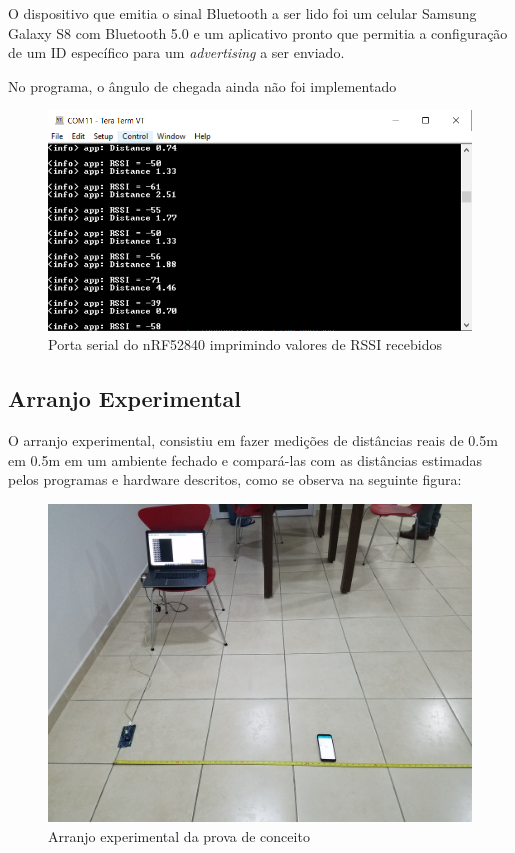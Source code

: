O dispositivo que emitia o sinal Bluetooth a ser lido foi um celular Samsung Galaxy S8 com Bluetooth 5.0 e um aplicativo pronto que permitia a configuração de um ID específico para um \textit{advertising} a ser enviado.

No programa, o ângulo de chegada ainda não foi implementado

\begin{figure}[H]
	\centering 
	\includegraphics[scale = 0.85]{images/rssi_terminal.png}
	\caption{Porta serial do nRF52840 imprimindo valores de RSSI recebidos}
	\label{fig:rssi_terminal}
\end{figure}

\subsection{Arranjo Experimental}
O arranjo experimental, consistiu em fazer medições de distâncias reais de 0.5m em 0.5m em um ambiente fechado e compará-las com as distâncias estimadas pelos programas e hardware descritos, como se observa na seguinte figura:

\begin{figure}[H]
	\centering 
	\includegraphics[scale = 0.1]{images/setup_poc.jpg}
	\caption{Arranjo experimental da prova de conceito}
	\label{fig:setup_poc}
\end{figure}


